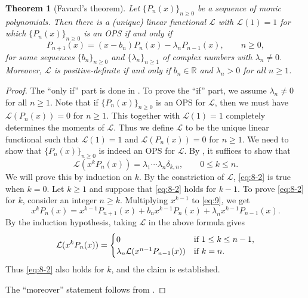 \documentclass[oneside]{book}
\numberwithin{equation}{section}
\newtheorem{thm}{Theorem}[section]
\theoremstyle{definition}
\newcommand{\RR}{\mathbb{R}}
\newcommand\LL{\mathcal{L}}
\begin{document}
\begin{thm}[Favard's theorem]
  Let \( \{ P_n(x) \}_{n\ge 0} \) be a sequence of monic polynomials.
  Then there is a (unique) linear functional \( \LL \) with
  \( \LL(1) = 1 \) for which \( \{ P_n(x) \}_{n\ge 0} \) is an OPS
  if and only if 
  \begin{equation}\label{eq:9}
    P_{n+1}(x) = (x-b_n) P_n(x) - \lambda_n P_{n-1}(x), \qquad n\ge 0,
  \end{equation}
  for some sequences \( \{b_n\}_{n\ge0} \) and
  \( \{\lambda_n\}_{n\ge1} \) of complex numbers with
  \( \lambda_n\ne0 \). Moreover, \( \LL \) is positive-definite if and
  only if \( b_n\in \RR \) and \( \lambda_n>0 \) for all \( n\ge1 \).
\end{thm}

\begin{proof}
  The ``only if'' part is done in . To prove the ``if''
  part, we assume \( \lambda_n\ne 0 \) for all \( n\ge1 \). Note that
  if \( \{ P_n(x) \}_{n\ge 0} \) is an OPS for \( \LL \), then we must
  have \( \LL(P_n(x)) = 0 \) for \( n\ge1 \). This together with
  \( \LL(1) = 1 \) completely determines the moments of \( \LL \).
  Thus we define \( \LL \) to be the unique linear functional such
  that \( \LL(1) = 1 \) and \( \LL(P_n(x)) = 0 \) for \( n\ge1 \). We
  need to show that \( \{ P_n(x) \}_{n\ge 0} \) is indeed an OPS for
  \( \LL \). By , it suffices to show that
  \begin{equation}\label{eq:8-2}
    \LL(x^k P_n(x)) = \lambda_1 \cdots \lambda_n \delta_{k,n}, \qquad 0\le k\le n.
  \end{equation}
  We will prove this by induction on \( k \). By the
  constriction of \( \LL \), \eqref{eq:8-2} is true when \( k=0 \).
  Let \( k\ge1 \) and suppose that \eqref{eq:8-2} holds for \( k-1 \).
  To prove \eqref{eq:8-2} for \( k \), consider an integer
  \( n\ge k \). Multiplying \( x^{k-1} \) to \eqref{eq:9}, we get
  \[
    x^k P_n(x) = x^{k-1} P_{n+1}(x) + b_n x^{k-1}P_n(x)  + \lambda_n x^{k-1} P_{n-1}(x).
  \]
  By the induction hypothesis, taking \( \LL \) in the above formula
  gives
  \[
    \LL(x^k P_n(x)) =
    \begin{cases}
     0 & \mbox{if \( 1\le k\le n-1 \)},\\
     \lambda_n \LL(x^{n-1} P_{n-1}(x)) & \mbox{if \( k=n \).}
    \end{cases}
  \]
  Thus \eqref{eq:8-2} also holds for \( k \), and the claim is
  established.

  The ``moreover'' statement follows from .
\end{proof}
\end{document}
